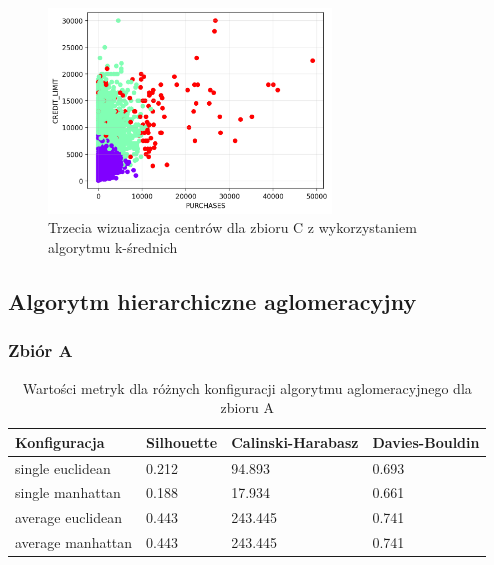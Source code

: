 \documentclass[a4paper,11pt]{article}
\begin{document}
\begin{figure}[H]
    \centering
    \includegraphics[width=0.67\textwidth]{images2/kmeans/Kmeans_CC_3.png}
    \caption{Trzecia wizualizacja centrów dla zbioru C z wykorzystaniem algorytmu k-średnich}
    \label{tab:km_c_wis_3}
\end{figure}

\subsection{Algorytm hierarchiczne aglomeracyjny}

    \subsubsection*{Zbiór A}
        \begin{table}[H]
            \centering
            \begin{tabular}{|l|l|l|l|}
            \hline
            \textbf{Konfiguracja} & \textbf{Silhouette} & \textbf{Calinski-Harabasz} & \textbf{Davies-Bouldin} \\ \hline
            single euclidean         & 0.212               & 94.893                     & 0.693                   \\ \hline
            single manhattan         & 0.188               & 17.934                     & 0.661                   \\ \hline
            average euclidean        & 0.443               & 243.445                    & 0.741                   \\ \hline
            average manhattan        & 0.443               & 243.445                    & 0.741                   \\ \hline
            \end{tabular}
            \caption{Wartości metryk dla różnych konfiguracji algorytmu aglomeracyjnego dla zbioru A}
            \label{tab:agg_a}
        \end{table}
        
\end{document}
